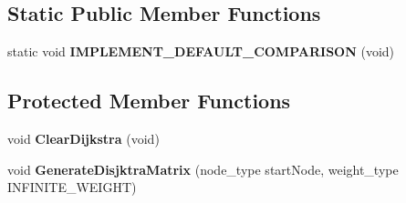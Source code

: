 \subsection*{Static Public Member Functions}
\begin{DoxyCompactItemize}
\item 
\hypertarget{class_data_structures_1_1_weighted_graph_a6b27537b51fc124f107b1ab44ad81f76}{static void {\bfseries I\-M\-P\-L\-E\-M\-E\-N\-T\-\_\-\-D\-E\-F\-A\-U\-L\-T\-\_\-\-C\-O\-M\-P\-A\-R\-I\-S\-O\-N} (void)}\label{class_data_structures_1_1_weighted_graph_a6b27537b51fc124f107b1ab44ad81f76}

\end{DoxyCompactItemize}
\subsection*{Protected Member Functions}
\begin{DoxyCompactItemize}
\item 
\hypertarget{class_data_structures_1_1_weighted_graph_abb95a374208eb9c62101aae4c00f9072}{void {\bfseries Clear\-Dijkstra} (void)}\label{class_data_structures_1_1_weighted_graph_abb95a374208eb9c62101aae4c00f9072}

\item 
\hypertarget{class_data_structures_1_1_weighted_graph_ac1f514b3abe06d47cb5991d592f16e17}{void {\bfseries Generate\-Disjktra\-Matrix} (node\-\_\-type start\-Node, weight\-\_\-type I\-N\-F\-I\-N\-I\-T\-E\-\_\-\-W\-E\-I\-G\-H\-T)}\label{class_data_structures_1_1_weighted_graph_ac1f514b3abe06d47cb5991d592f16e17}

\end{DoxyCompactItemize}
